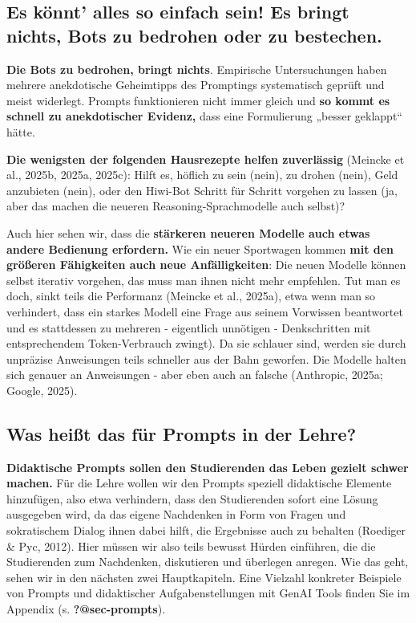 \documentclass[
  ngerman,
  letterpaper,
  DIV=11]{scrreprt}
\begin{document}
\subsection{Es könnt' alles so einfach sein! Es bringt nichts, Bots zu
bedrohen oder zu bestechen.}\label{sec-prompting-myths}

\textbf{Die Bots zu bedrohen, bringt nichts}. Empirische Untersuchungen
haben mehrere anekdotische Geheimtipps des Promptings systematisch
geprüft und meist widerlegt. Prompts funktionieren nicht immer gleich
und \textbf{so kommt es schnell zu anekdotischer Evidenz,} dass eine
Formulierung „besser geklappt`` hätte.

\textbf{Die wenigsten der folgenden Hausrezepte helfen zuverlässig}
(Meincke et al., 2025b, 2025a, 2025c): Hilft es, höflich zu sein (nein),
zu drohen (nein), Geld anzubieten (nein), oder den Hiwi-Bot Schritt für
Schritt vorgehen zu lassen (ja, aber das machen die neueren
Reasoning-Sprachmodelle auch selbst)?

Auch hier sehen wir, dass die \textbf{stärkeren neueren Modelle auch
etwas andere Bedienung erfordern.} Wie ein neuer Sportwagen kommen
\textbf{mit den größeren Fähigkeiten auch neue Anfälligkeiten}: Die
neuen Modelle können selbst iterativ vorgehen, das muss man ihnen nicht
mehr empfehlen. Tut man es doch, sinkt teils die Performanz (Meincke et
al., 2025a), etwa wenn man so verhindert, dass ein starkes Modell eine
Frage aus seinem Vorwissen beantwortet und es stattdessen zu mehreren -
eigentlich unnötigen - Denkschritten mit entsprechendem Token-Verbrauch
zwingt). Da sie schlauer sind, werden sie durch unpräzise Anweisungen
teils schneller aus der Bahn geworfen. Die Modelle halten sich genauer
an Anweisungen - aber eben auch an falsche (Anthropic, 2025a; Google,
2025).

\subsection{Was heißt das für Prompts in der
Lehre?}\label{sec-prompts-teaching}

\textbf{Didaktische Prompts sollen den Studierenden das Leben gezielt
schwer machen.} Für die Lehre wollen wir den Prompts speziell
didaktische Elemente hinzufügen, also etwa verhindern, dass den
Studierenden sofort eine Lösung ausgegeben wird, da das eigene
Nachdenken in Form von Fragen und sokratischem Dialog ihnen dabei hilft,
die Ergebnisse auch zu behalten (Roediger \& Pyc, 2012). Hier müssen wir
also teils bewusst Hürden einführen, die die Studierenden zum
Nachdenken, diskutieren und überlegen anregen. Wie das geht, sehen wir
in den nächsten zwei Hauptkapiteln. Eine Vielzahl konkreter Beispiele
von Prompts und didaktischer Aufgabenstellungen mit GenAI Tools finden
Sie im Appendix (s. \textbf{?@sec-prompts}).
\end{document}
